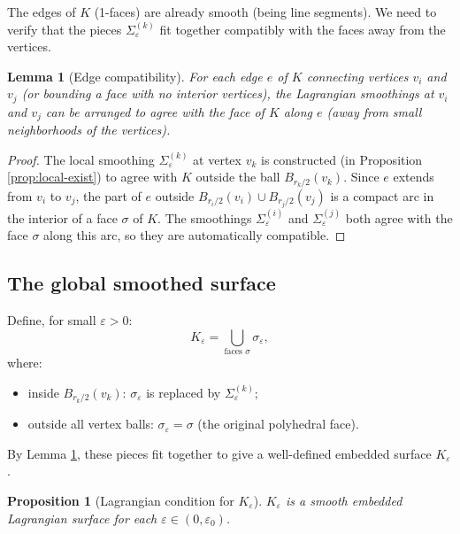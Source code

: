 \documentclass[12pt]{article}
\newtheorem{proposition}[theorem]{Proposition}
\newtheorem{lemma}[theorem]{Lemma}
\newcommand{\eps}{\varepsilon}
\begin{document}
The edges of $K$ (1-faces) are already smooth (being line segments). We need to verify that the pieces $\Sigma_\eps^{(k)}$ fit together compatibly with the faces away from the vertices.

\begin{lemma}[Edge compatibility]
\label{lem:edge-compat}
For each edge $e$ of $K$ connecting vertices $v_i$ and $v_j$ (or bounding a face with no interior vertices), the Lagrangian smoothings at $v_i$ and $v_j$ can be arranged to agree with the face of $K$ along $e$ (away from small neighborhoods of the vertices).
\end{lemma}

\begin{proof}
The local smoothing $\Sigma_\eps^{(k)}$ at vertex $v_k$ is constructed (in Proposition \ref{prop:local-exist}) to agree with $K$ outside the ball $B_{r_k/2}(v_k)$. Since $e$ extends from $v_i$ to $v_j$, the part of $e$ outside $B_{r_i/2}(v_i) \cup B_{r_j/2}(v_j)$ is a compact arc in the interior of a face $\sigma$ of $K$. The smoothings $\Sigma_\eps^{(i)}$ and $\Sigma_\eps^{(j)}$ both agree with the face $\sigma$ along this arc, so they are automatically compatible.
\end{proof}

\subsection{The global smoothed surface}

Define, for small $\eps > 0$:
\[
  K_\eps = \bigcup_{\text{faces }\sigma} \sigma_\eps,
\]
where:
\begin{itemize}
  \item inside $B_{r_k/2}(v_k)$: $\sigma_\eps$ is replaced by $\Sigma_\eps^{(k)}$;
  \item outside all vertex balls: $\sigma_\eps = \sigma$ (the original polyhedral face).
\end{itemize}

By Lemma \ref{lem:edge-compat}, these pieces fit together to give a well-defined embedded surface $K_\eps$.

\begin{proposition}[Lagrangian condition for $K_\eps$]
$K_\eps$ is a smooth embedded Lagrangian surface for each $\eps \in (0, \eps_0)$.
\end{proposition}
\end{document}

